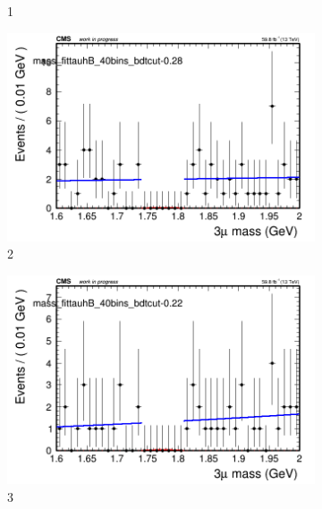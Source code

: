 \begin{figure}[h!]
\begin{subfigure}{0.2\textwidth}
        \caption{1}
    \end{subfigure}
    \begin{subfigure}{0.2\textwidth}
        \includegraphics[width=\textwidth]{unfixed_exp/plots/tauhB/massfit_tauhB_40bins_bdtcut-0.28.png}
        \caption{2}
    \end{subfigure}
    \begin{subfigure}{0.2\textwidth}
        \includegraphics[width=\textwidth]{unfixed_exp/plots/tauhB/massfit_tauhB_40bins_bdtcut-0.22.png}
        \caption{3}
    \end{subfigure}
    \begin{subfigure}{0.2\textwidth}

\end{subfigure}
\end{figure}
